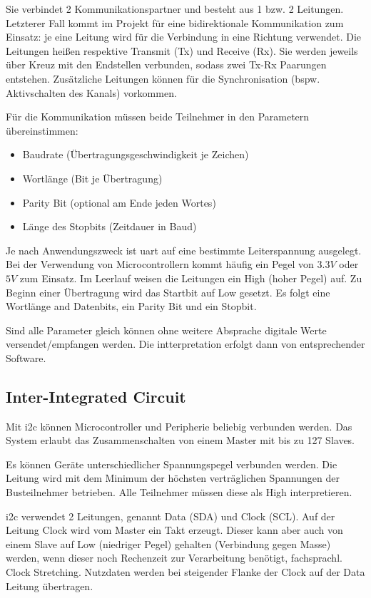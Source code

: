 Sie verbindet 2 Kommunikationspartner und besteht aus 1 bzw. 2 Leitungen. Letzterer Fall kommt im Projekt für eine bidirektionale Kommunikation zum Einsatz: je eine Leitung wird für die Verbindung in eine Richtung verwendet. Die Leitungen heißen respektive Transmit (Tx) und Receive (Rx). Sie werden jeweils über Kreuz mit den Endstellen verbunden, sodass zwei Tx-Rx Paarungen entstehen. Zusätzliche Leitungen können für die Synchronisation (bspw. Aktivschalten des Kanals) vorkommen.

Für die Kommunikation müssen beide Teilnehmer in den Parametern übereinstimmen:
\begin{itemize}
    \item Baudrate (Übertragungsgeschwindigkeit je Zeichen)
    \item Wortlänge (Bit je Übertragung)
    \item Parity Bit (optional am Ende jeden Wortes)
    \item Länge des Stopbits (Zeitdauer in Baud)
\end{itemize}

Je nach Anwendungszweck ist \gls{uart} auf eine bestimmte Leiterspannung ausgelegt. Bei der Verwendung von Microcontrollern kommt häufig ein Pegel von $3.3V$ oder $5V$ zum Einsatz. Im Leerlauf weisen die Leitungen ein High (hoher Pegel) auf. Zu Beginn einer Übertragung wird das Startbit auf Low gesetzt. Es folgt eine Wortlänge and Datenbits, ein Parity Bit und ein Stopbit.\newline

Sind alle Parameter gleich können ohne weitere Absprache digitale Werte versendet/empfangen werden. Die intterpretation erfolgt dann von entsprechender Software.

\subsection{Inter-Integrated Circuit}
Mit \gls{i2c} können Microcontroller und Peripherie beliebig verbunden werden. Das System erlaubt das Zusammenschalten von einem Master mit bis zu 127 Slaves.

Es können Geräte unterschiedlicher Spannungspegel verbunden werden. Die Leitung wird mit dem Minimum der höchsten verträglichen Spannungen der Busteilnehmer betrieben. Alle Teilnehmer müssen diese als High interpretieren.

\gls{i2c} verwendet 2 Leitungen, genannt Data (SDA) und Clock (SCL). Auf der Leitung Clock wird vom Master ein Takt erzeugt. Dieser kann aber auch von einem Slave auf Low (niedriger Pegel) gehalten (Verbindung gegen Masse) werden, wenn dieser noch Rechenzeit zur Verarbeitung benötigt, fachsprachl. Clock Stretching. Nutzdaten werden bei steigender Flanke der Clock auf der Data Leitung übertragen.

